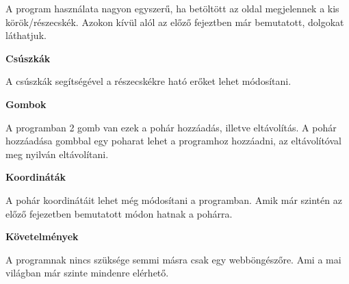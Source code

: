 
A program használata nagyon egyszerű, ha betöltött az oldal megjelennek a kis körök/részecskék. Azokon kívül alól az előző fejeztben  már bemutatott, dolgokat láthatjuk. 

\textbf{Csúszkák}

 A csúszkák segítségével a részecskékre ható erőket lehet módosítani.


\textbf{Gombok}

A programban 2 gomb van ezek a pohár hozzáadás, illetve eltávolítás. A pohár hozzáadása gombbal egy poharat lehet a programhoz hozzáadni, az eltávolítóval meg nyilván eltávolítani. 

\textbf{Koordináták}

A pohár koordinátáit lehet még módosítani a programban. Amik már szintén az előző fejezetben  bemutatott módon hatnak a pohárra. 

\textbf{Követelmények}

A programnak nincs szüksége semmi másra csak egy webböngészőre. Ami a mai világban már szinte mindenre elérhető. 

